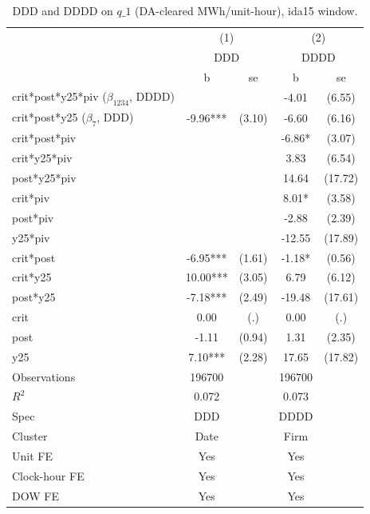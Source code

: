 \begin{table}[htbp]\centering
\def\sym#1{\ifmmode^{#1}\else\(^{#1}\)\fi}
\caption{DDD and DDDD on $q\_1$ (DA-cleared MWh/unit-hour), ida15 window.}\label{tab:reform_ddd_firm_q1_ida15}
\begin{tabular}{l*{2}{cc}}
\toprule
                    &\multicolumn{2}{c}{(1)}     &\multicolumn{2}{c}{(2)}     \\
                    &\multicolumn{2}{c}{DDD}     &\multicolumn{2}{c}{DDDD}    \\
                    &           b   &          se&           b   &          se\\
\midrule
crit*post*y25*piv ($\beta_{1234}$, DDDD)&               &            &       -4.01   &      (6.55)\\
crit*post*y25 ($\beta_7$, DDD)&       -9.96***&      (3.10)&       -6.60   &      (6.16)\\
crit*post*piv       &               &            &       -6.86*  &      (3.07)\\
crit*y25*piv        &               &            &        3.83   &      (6.54)\\
post*y25*piv        &               &            &       14.64   &     (17.72)\\
crit*piv            &               &            &        8.01*  &      (3.58)\\
post*piv            &               &            &       -2.88   &      (2.39)\\
y25*piv             &               &            &      -12.55   &     (17.89)\\
crit*post           &       -6.95***&      (1.61)&       -1.18*  &      (0.56)\\
crit*y25            &       10.00***&      (3.05)&        6.79   &      (6.12)\\
post*y25            &       -7.18***&      (2.49)&      -19.48   &     (17.61)\\
crit                &        0.00   &         (.)&        0.00   &         (.)\\
post                &       -1.11   &      (0.94)&        1.31   &      (2.35)\\
y25                 &        7.10***&      (2.28)&       17.65   &     (17.82)\\
\midrule
Observations        &      196700   &            &      196700   &            \\
$R^2$               &       0.072   &            &       0.073   &            \\
Spec                &         DDD   &            &        DDDD   &            \\
Cluster             &        Date   &            &        Firm   &            \\
Unit FE             &         Yes   &            &         Yes   &            \\
Clock-hour FE       &         Yes   &            &         Yes   &            \\
DOW FE              &         Yes   &            &         Yes   &            \\
\bottomrule
\end{tabular}
\end{table}
